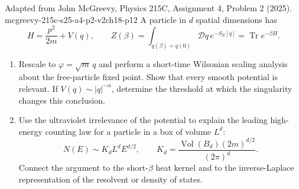 \begin{enumerate}
  {Adapted from John McGreevy, Physics 215C, Assignment 4, Problem 2 (2025).}
  {mcgreevy-215c-s25-a4-p2-v2ch18-p12}
  A particle in \(d\) spatial dimensions has
  \[
    H=\frac{p^2}{2m}+V(q),\qquad
    Z(\beta)=\int_{q(\beta)=q(0)}\mathcal Dq\,e^{-S_E[q]}
      =\operatorname{Tr}e^{-\beta H}.
  \]
  \begin{enumerate}
    \item[(a)] Rescale to \(\varphi=\sqrt m\,q\) and perform a short-time
      Wilsonian scaling analysis about the free-particle fixed point.  Show
      that every smooth potential is relevant.  If
      \(V(q)\sim |q|^{-\alpha}\), determine the threshold at which the
      singularity changes this conclusion.
    \item[(b)] Use the ultraviolet irrelevance of the potential to explain
      the leading high-energy counting law for a particle in a box of
      volume \(L^d\):
      \[
        N(E)\sim K_dL^dE^{d/2},
        \qquad
        K_d=\frac{\operatorname{Vol}(B_d)(2m)^{d/2}}{(2\pi)^d}.
      \]
      Connect the argument to the short-\(\beta\) heat kernel and to the
      inverse-Laplace representation of the resolvent or density of states.
  \end{enumerate}

\end{enumerate}
